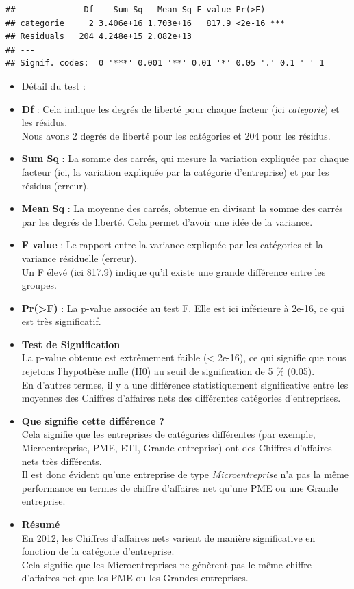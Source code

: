 \documentclass[mstat,12pt]{unswthesis}
\begin{document}
\medskip

\begin{verbatim}
##              Df    Sum Sq   Mean Sq F value Pr(>F)    
## categorie     2 3.406e+16 1.703e+16   817.9 <2e-16 ***
## Residuals   204 4.248e+15 2.082e+13                   
## ---
## Signif. codes:  0 '***' 0.001 '**' 0.01 '*' 0.05 '.' 0.1 ' ' 1
\end{verbatim}

\begin{itemize}
\item
  Détail du test :
\item
  \textbf{Df} : Cela indique les degrés de liberté pour chaque facteur
  (ici \emph{categorie}) et les résidus.\\
  Nous avons 2 degrés de liberté pour les catégories et 204 pour les
  résidus.
\item
  \textbf{Sum Sq} : La somme des carrés, qui mesure la variation
  expliquée par chaque facteur (ici, la variation expliquée par la
  catégorie d'entreprise) et par les résidus (erreur).
\item
  \textbf{Mean Sq} : La moyenne des carrés, obtenue en divisant la somme
  des carrés par les degrés de liberté. Cela permet d'avoir une idée de
  la variance.
\item
  \textbf{F value} : Le rapport entre la variance expliquée par les
  catégories et la variance résiduelle (erreur).\\
  Un F élevé (ici 817.9) indique qu'il existe une grande différence
  entre les groupes.
\item
  \textbf{Pr(\textgreater F)} : La p-value associée au test F. Elle est
  ici inférieure à 2e-16, ce qui est très significatif.
\item
  \textbf{Test de Signification}\\
  La p-value obtenue est extrêmement faible (\textless{} 2e-16), ce qui
  signifie que nous rejetons l'hypothèse nulle (H0) au seuil de
  signification de 5 \% (0.05).\\
  En d'autres termes, il y a une différence statistiquement
  significative entre les moyennes des Chiffres d'affaires nets des
  différentes catégories d'entreprises.
\item
  \textbf{Que signifie cette différence ?}\\
  Cela signifie que les entreprises de catégories différentes (par
  exemple, Microentreprise, PME, ETI, Grande entreprise) ont des
  Chiffres d'affaires nets très différents.\\
  Il est donc évident qu'une entreprise de type \emph{Microentreprise}
  n'a pas la même performance en termes de chiffre d'affaires net qu'une
  PME ou une Grande entreprise.
\item
  \textbf{Résumé}\\
  En 2012, les Chiffres d'affaires nets varient de manière significative
  en fonction de la catégorie d'entreprise.\\
  Cela signifie que les Microentreprises ne génèrent pas le même chiffre
  d'affaires net que les PME ou les Grandes entreprises.
\end{itemize}
\end{document}

